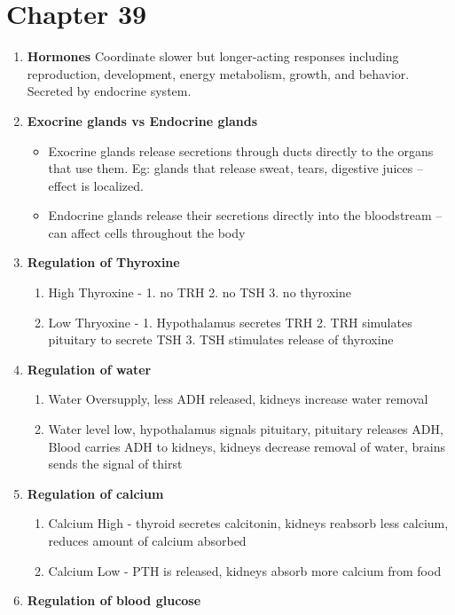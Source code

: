\documentclass[9pt]{article}
\begin{document}
\section*{Chapter 39}
\begin{enumerate}
  \item {\bf Hormones} Coordinate slower but longer-acting responses
    including reproduction, development, energy metabolism, growth,
    and behavior. Secreted by endocrine system.
  \item {\bf Exocrine glands vs Endocrine glands}
    \begin{itemize}
      \item Exocrine glands release secretions through ducts directly
        to the organs that use them. Eg: glands that release sweat,
        tears, digestive juices – effect is localized.
      \item Endocrine glands release their secretions directly into
        the bloodstream – can affect cells throughout the body
    \end{itemize}
  \item {\bf Regulation of Thyroxine}
  \begin{enumerate}
    \item High Thyroxine - 1. no TRH 2. no TSH 3. no thyroxine
    \item Low Thryoxine - 1. Hypothalamus secretes TRH 2. TRH simulates pituitary to secrete TSH 3. TSH stimulates release of thyroxine
  \end{enumerate}
  \item {\bf Regulation of water}
  \begin{enumerate}
    \item Water Oversupply, less ADH released, kidneys increase water removal
    \item Water level low, hypothalamus signals pituitary, pituitary releases ADH, Blood carries ADH to kidneys, kidneys decrease removal of water, brains sends the signal of thirst
  \end{enumerate}
  \item {\bf Regulation of calcium}
  \begin {enumerate}
    \item Calcium High - thyroid secretes calcitonin, kidneys reabsorb less calcium, reduces amount of calcium absorbed
    \item Calcium Low - PTH is released, kidneys absorb more calcium from food
  \end{enumerate}
  \item {\bf Regulation of blood glucose}

\end{enumerate}
\end{document}
